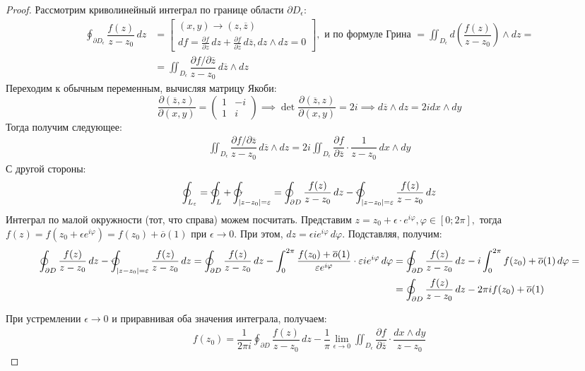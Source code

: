 \begin{proof}
	Рассмотрим криволинейный интеграл по границе области $\partial D_{\epsilon}$:
	\begin{align*}
		\oint_{\partial D_{\epsilon}} \dfrac{f(z)}{z - z_0}\, dz  &= \begin{bmatrix}
			(x, y) \to (z, \overline{z}) \\
			df = \frac{\partial f}{\partial z}\, dz + \frac{\partial f}{\partial \overline{z}}\, d\overline{z}, dz \wedge dz = 0
		\end{bmatrix}, \text{ и по формуле Грина } = \iint_{D_{\epsilon}} d \left(\dfrac{f(z)}{z - z_0}\right) \wedge dz	= \\
		&=\iint_{D_{\epsilon}} \dfrac{\partial f/\partial \overline{z}}{z - z_0}\, d\overline{z} \wedge dz
	\end{align*}
Переходим к обычным переменным, вычисляя матрицу Якоби:
 $$
\dfrac{\partial(\overline{z}, z)}{\partial (x,y)} = \begin{pmatrix}
1 & -i \\
1 & i
\end{pmatrix} \implies \operatorname{det} \dfrac{\partial(\overline{z}, z)}{\partial (x,y)} = 2i \implies  d\overline{z} \wedge dz = 2i dx\wedge dy
$$
Тогда получим следующее:
\begin{align*}
	\iint_{D_{\epsilon}} \dfrac{\partial f/\partial \overline{z}}{z - z_0}\, d\overline{z} \wedge dz = 2i \iint_{D_{\epsilon}} \dfrac{\partial f}{\partial \overline{z}} \cdot \dfrac{1}{z - z_0}\, dx\wedge dy
\end{align*}
С другой стороны:
\begin{align*}
	\oint_{L_{\epsilon}} =\varointctrclockwise_{L} + \varointclockwise_{|z - z_0| = \epsilon} = \oint_{\partial D} \dfrac{f(z)}{z - z_0}\, dz - \varointctrclockwise_{|z - z_0| = \epsilon} \dfrac{f(z)}{z - z_0}\, dz
\end{align*}
Интеграл  по малой окружности (тот, что справа) можем посчитать. Представим $z = z_0 + \epsilon \cdot e^{i\varphi}, \varphi \in [0; 2\pi],$ тогда $f(z) = f(z_0 + \epsilon e^{i\varphi}) = f(z_0) + \overline{o}(1)$ при $\epsilon \to 0$. При этом,  $dz = \epsilon i e^{i\varphi}\, d\varphi$. Подставляя, получим:
\begin{align*}
	\oint_{\partial D} \dfrac{f(z)}{z - z_0}\, dz - \varointctrclockwise_{|z - z_0| = \epsilon} \dfrac{f(z)}{z - z_0}\, dz = \oint_{\partial D} \dfrac{f(z)}{z - z_0}\, dz -  \int_{0}^{2\pi} \dfrac{f(z_0) + \overline{o}(1)}{\epsilon e^{i\varphi}} \cdot  \epsilon i e^{i\varphi}\, d\varphi &=\oint_{\partial D} \dfrac{f(z)}{z - z_0}\, dz -  i \int_{0}^{2\pi} f(z_0) + \overline{o}(1) \, d\varphi  = \\
	&= \oint_{\partial D} \dfrac{f(z)}{z - z_0}\, dz - 2\pi i f(z_0) + \overline{o}(1) 
\end{align*}

При устремлении  $\epsilon \to 0$ и приравнивая оба значения интеграла, получаем:
\begin{align*}
	f(z_0) =\dfrac{1}{2\pi i} \oint_{\partial D} \dfrac{f(z)}{z - z_0}\, dz - \dfrac{1}{\pi} \lim\limits_{\epsilon \to 0} \iint_{D_{\epsilon}} \dfrac{\partial f}{\partial \overline{z}} \cdot \dfrac{dx \wedge dy}{z - z_0}
\end{align*}
\end{proof}

